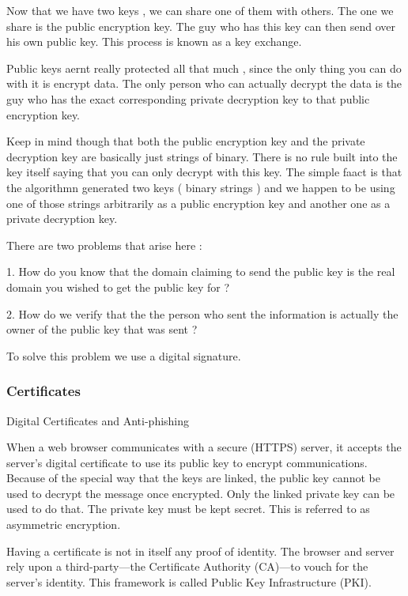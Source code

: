 Now that we have two keys , we can share one of them with others. The one we
share is the public encryption key. The guy who has this key can then send over
his own public key. This process is known as a key exchange.

Public keys aernt really protected all that much , since the only thing you can
do with it is encrypt data. The only person who can actually decrypt the data is
the guy who has the exact corresponding private decryption key to that public
encryption key.

Keep in mind though that both the public encryption key and the private
decryption key are basically just strings of binary. There is no rule built into
the key itself saying that you can only decrypt with this key. The simple faact
is that the algorithmn generated two keys ( binary strings ) and we happen to be
using one of those strings arbitrarily as a public encryption key and another
one as a private decryption key.

There are two problems that arise here :

1. How do you know that the domain claiming to send the public key is the real
domain you wished to get the public key for ?

2. How do we verify that the the person who sent the information is actually the
owner of the public key that was sent ?

To solve this problem we use a digital signature.


\subsubsectionend

\subsubsection{Certificates}
\label{sssec:certificates}

Digital Certificates and Anti-phishing

When a web browser communicates with a secure (HTTPS) server, it accepts the
server's digital certificate to use its public key to encrypt communications.
Because of the special way that the keys are linked, the public key cannot be
used to decrypt the message once encrypted. Only the linked private key can be
used to do that. The private key must be kept secret. This is referred to as
asymmetric encryption. 

Having a certificate is not in itself any proof of identity. The browser and
server rely upon a third-party—the Certificate Authority (CA)—to vouch for the
server's identity. This framework is called Public Key Infrastructure (PKI).


